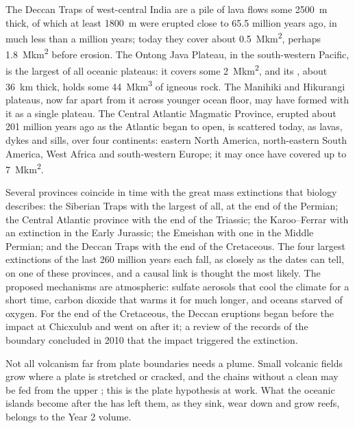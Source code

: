 The Deccan Traps of west-central India are a pile of lava flows some
\qty{2500}{m} thick, of which at least \qty{1800}{m} were erupted close to
65.5 million years ago, in much less than a million years; today they cover
about \qty{0.5}{\mega km^2}, perhaps \qty{1.8}{\mega km^2} before erosion. The
Ontong Java Plateau, in the south-western Pacific, is the largest of all
oceanic plateaus: it covers some \qty{2}{\mega km^2}, and its , about
\qty{36}{km} thick, holds some \qty{44}{\mega km^3} of igneous rock. The
Manihiki and Hikurangi plateaus, now far apart from it across younger ocean
floor, may have formed with it as a single plateau. The Central Atlantic
Magmatic Province, erupted about 201 million years ago as the Atlantic began to
open, is scattered today, as lavas, dykes and sills, over four continents:
eastern North America, north-eastern South America, West Africa and
south-western Europe; it may once have covered up to \qty{7}{\mega km^2}.


Several provinces coincide in time with the great mass extinctions that
biology describes: the Siberian Traps with the largest of all, at the end of
the Permian; the Central Atlantic province with the end of the Triassic; the
Karoo--Ferrar with an extinction in the Early Jurassic; the Emeishan with one
in the Middle Permian; and the Deccan Traps with the end of the Cretaceous. The
four largest extinctions of the last 260 million years each fall, as closely
as the dates can tell, on one of these provinces, and a causal link is
thought the most likely. The proposed mechanisms are atmospheric: sulfate
aerosols that cool the climate for a short time, carbon dioxide that warms it
for much longer, and oceans starved of oxygen. For the end of the Cretaceous,
the Deccan eruptions began before the impact at Chicxulub and went on after
it; a review of the records of the boundary concluded in 2010 that the impact
triggered the extinction.

Not all volcanism far from plate boundaries needs a plume. Small volcanic
fields grow where a plate is stretched or cracked, and the chains without a
clean  may be fed from the upper ; this is the plate
hypothesis at work. What the oceanic islands become after the  has left
them, as they sink, wear down and grow reefs, belongs to the Year 2 volume.

